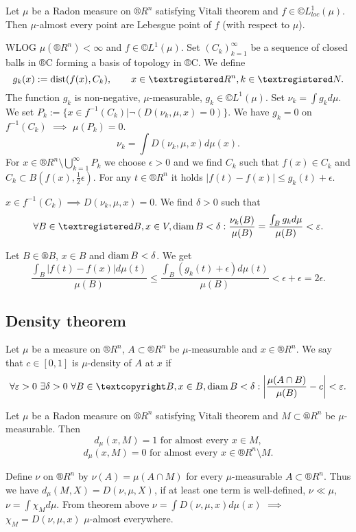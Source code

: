 \documentclass[12pt]{article}					%
\begin{document}
\begin{veta}
	Let $\mu$ be a Radon measure on $®R^n$ satisfying Vitali theorem and $f \in ©L_{loc}^1(\mu)$. Then $\mu$-almost every point are Lebesgue point of $f$ (with respect to $\mu$).

	\begin{dukazin}
		WLOG $\mu(®R^n) < ∞$ and $f \in ©L^1(\mu)$. Set $(C_k)_{k=1}^∞$ be a sequence of closed balls in ®C forming a basis of topology in ®C. We define
		$$ g_k(x) := \dist(f(x), C_k), \qquad x \in ®R^n, k \in ®N. $$
		The function $g_k$ is non-negative, $\mu$-measurable, $g_k \in ©L^1(\mu)$. Set $\nu_k = \int g_k d\mu$. We set $P_k := \{x \in f^{-1}(C_k) | \neg(D(\nu_k, \mu, x) = 0)\}$. We have $g_k = 0$ on $f^{-1}(C_k)$ $\implies$ $\mu(P_k) = 0$.
		$$ \nu_k = \int D(\nu_k, \mu, x) d\mu(x). $$
		For $x \in ®R^n \setminus \bigcup_{k=1}^∞ P_k$ we choose $\epsilon > 0$ and we find $C_k$ such that $f(x) \in C_k$ and $C_k \subset B(f(x), \frac{1}{2} \epsilon)$. For any $t \in ®R^n$ it holds $|f(t) - f(x)| ≤ g_k(t) + \epsilon$.

		$x \in f^{-1}(C_k) \implies D(\nu_k, \mu, x) = 0$. We find $\delta > 0$ such that
		$$ \forall B \in ®B, x \in V, \diam B < \delta: \frac{\nu_k(B)}{\mu(B)} = \frac{\int_B g_k d\mu}{\mu(B)} < \epsilon. $$

		Let $B \in ®B$, $x \in B$ and $\operatorname{diam} B < \delta$. We get
		$$ \frac{\int_B |f(t) - f(x)| d\mu(t)}{\mu(B)} ≤ \frac{\int_B (g_k(t) + \epsilon) d\mu(t)}{\mu(B)} < \epsilon + \epsilon = 2\epsilon. $$
	\end{dukazin}
\end{veta}

\subsection{Density theorem}

\begin{definice}
	Let $\mu$ be a measure on $®R^n$, $A \subset ®R^n$ be $\mu$-measurable and $x \in ®R^n$. We say that $c \in [0, 1]$ is $\mu$-density of $A$ at $x$ if
	$$ \forall \epsilon > 0\ \exists \delta > 0\ \forall B \in ©B, x \in B, \diam B < \delta: \left|\frac{\mu(A \cap B)}{\mu(B)} - c\right|<\epsilon. $$
\end{definice}

\begin{veta}
	Let $\mu$ be a Radon measure on $®R^n$ satisfying Vitali theorem and $M \subset ®R^n$ be $\mu$-measurable. Then
	$$ d_\mu(x, M) = 1 \text{ for almost every } x \in M, $$
	$$ d_\mu(x, M) = 0 \text{ for almost every } x \in ®R^n\setminus M. $$
	
	\begin{dukazin}
		Define $\nu$ on $®R^n$ by $\nu(A) = \mu(A \cap M)$ for every $\mu$-measurable $A \subset ®R^n$. Thus we have $d_\mu(M, X) = D(\nu, \mu, X)$, if at least one term is well-defined, $\nu \ll \mu$, $\nu = \int \chi_M d\mu$. From theorem above $\nu = \int D(\nu, \mu, x) d\mu(x)$ $\implies$ $\chi_M = D(\nu, \mu, x)$ $\mu$-almost everywhere.
	\end{dukazin}
\end{veta}
\end{document}
